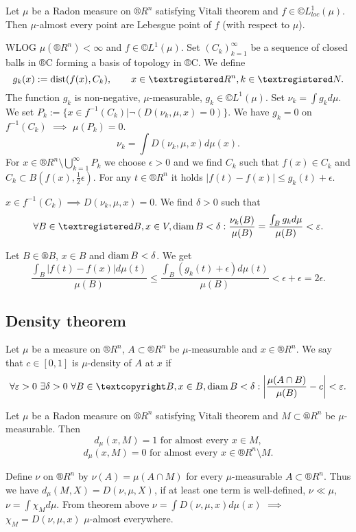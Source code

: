 \documentclass[12pt]{article}					%
\begin{document}
\begin{veta}
	Let $\mu$ be a Radon measure on $®R^n$ satisfying Vitali theorem and $f \in ©L_{loc}^1(\mu)$. Then $\mu$-almost every point are Lebesgue point of $f$ (with respect to $\mu$).

	\begin{dukazin}
		WLOG $\mu(®R^n) < ∞$ and $f \in ©L^1(\mu)$. Set $(C_k)_{k=1}^∞$ be a sequence of closed balls in ®C forming a basis of topology in ®C. We define
		$$ g_k(x) := \dist(f(x), C_k), \qquad x \in ®R^n, k \in ®N. $$
		The function $g_k$ is non-negative, $\mu$-measurable, $g_k \in ©L^1(\mu)$. Set $\nu_k = \int g_k d\mu$. We set $P_k := \{x \in f^{-1}(C_k) | \neg(D(\nu_k, \mu, x) = 0)\}$. We have $g_k = 0$ on $f^{-1}(C_k)$ $\implies$ $\mu(P_k) = 0$.
		$$ \nu_k = \int D(\nu_k, \mu, x) d\mu(x). $$
		For $x \in ®R^n \setminus \bigcup_{k=1}^∞ P_k$ we choose $\epsilon > 0$ and we find $C_k$ such that $f(x) \in C_k$ and $C_k \subset B(f(x), \frac{1}{2} \epsilon)$. For any $t \in ®R^n$ it holds $|f(t) - f(x)| ≤ g_k(t) + \epsilon$.

		$x \in f^{-1}(C_k) \implies D(\nu_k, \mu, x) = 0$. We find $\delta > 0$ such that
		$$ \forall B \in ®B, x \in V, \diam B < \delta: \frac{\nu_k(B)}{\mu(B)} = \frac{\int_B g_k d\mu}{\mu(B)} < \epsilon. $$

		Let $B \in ®B$, $x \in B$ and $\operatorname{diam} B < \delta$. We get
		$$ \frac{\int_B |f(t) - f(x)| d\mu(t)}{\mu(B)} ≤ \frac{\int_B (g_k(t) + \epsilon) d\mu(t)}{\mu(B)} < \epsilon + \epsilon = 2\epsilon. $$
	\end{dukazin}
\end{veta}

\subsection{Density theorem}

\begin{definice}
	Let $\mu$ be a measure on $®R^n$, $A \subset ®R^n$ be $\mu$-measurable and $x \in ®R^n$. We say that $c \in [0, 1]$ is $\mu$-density of $A$ at $x$ if
	$$ \forall \epsilon > 0\ \exists \delta > 0\ \forall B \in ©B, x \in B, \diam B < \delta: \left|\frac{\mu(A \cap B)}{\mu(B)} - c\right|<\epsilon. $$
\end{definice}

\begin{veta}
	Let $\mu$ be a Radon measure on $®R^n$ satisfying Vitali theorem and $M \subset ®R^n$ be $\mu$-measurable. Then
	$$ d_\mu(x, M) = 1 \text{ for almost every } x \in M, $$
	$$ d_\mu(x, M) = 0 \text{ for almost every } x \in ®R^n\setminus M. $$
	
	\begin{dukazin}
		Define $\nu$ on $®R^n$ by $\nu(A) = \mu(A \cap M)$ for every $\mu$-measurable $A \subset ®R^n$. Thus we have $d_\mu(M, X) = D(\nu, \mu, X)$, if at least one term is well-defined, $\nu \ll \mu$, $\nu = \int \chi_M d\mu$. From theorem above $\nu = \int D(\nu, \mu, x) d\mu(x)$ $\implies$ $\chi_M = D(\nu, \mu, x)$ $\mu$-almost everywhere.
	\end{dukazin}
\end{veta}
\end{document}
